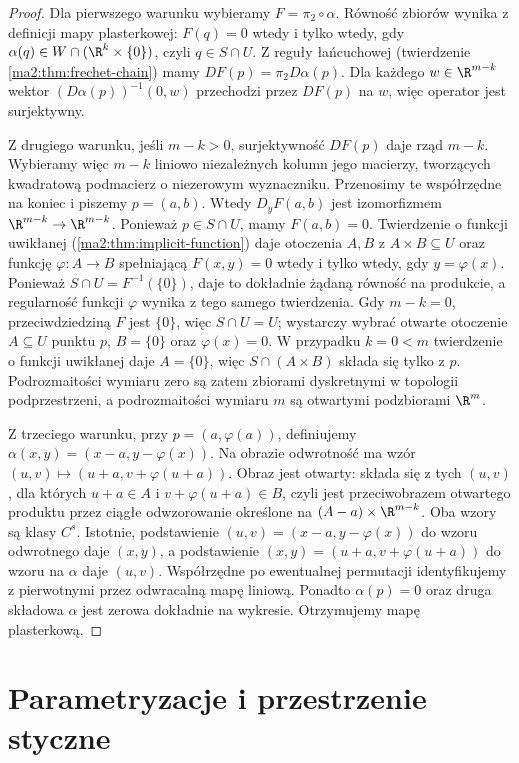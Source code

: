 \begin{proof}
Dla pierwszego warunku wybieramy $F=\pi_2\circ\alpha$.
Równość zbiorów wynika z definicji mapy plasterkowej:
$F(q)=0$ wtedy i tylko wtedy, gdy
$\alpha(q)\in W\cap(\R^k\times\{0\})$, czyli $q\in S\cap U$.
Z reguły łańcuchowej (twierdzenie \ref{ma2:thm:frechet-chain})
mamy $DF(p)=\pi_2D\alpha(p)$. Dla każdego $w\in\R^{m-k}$
wektor $(D\alpha(p))^{-1}(0,w)$ przechodzi przez $DF(p)$
na $w$, więc operator jest surjektywny.

Z drugiego warunku, jeśli $m-k>0$, surjektywność
$DF(p)$ daje rząd $m-k$. Wybieramy więc $m-k$
liniowo niezależnych kolumn jego macierzy, tworzących
kwadratową podmacierz o niezerowym wyznaczniku. Przenosimy te współrzędne na koniec
i piszemy $p=(a,b)$. Wtedy $D_yF(a,b)$ jest
izomorfizmem $\R^{m-k}\to\R^{m-k}$.
Ponieważ $p\in S\cap U$, mamy $F(a,b)=0$.
Twierdzenie o funkcji uwikłanej
(\ref{ma2:thm:implicit-function}) daje otoczenia
$A,B$ z $A\times B\subseteq U$ oraz funkcję
$\varphi:A\to B$ spełniającą
$F(x,y)=0$ wtedy i tylko wtedy, gdy $y=\varphi(x)$.
Ponieważ $S\cap U=F^{-1}(\{0\})$, daje to dokładnie
żądaną równość na produkcie, a regularność funkcji
$\varphi$ wynika z tego samego twierdzenia.
Gdy $m-k=0$, przeciwdziedziną $F$ jest $\{0\}$,
więc $S\cap U=U$; wystarczy wybrać otwarte
otoczenie $A\subseteq U$ punktu $p$, $B=\{0\}$
oraz $\varphi(x)=0$. W przypadku $k=0<m$
twierdzenie o funkcji uwikłanej daje $A=\{0\}$,
więc $S\cap(A\times B)$ składa się tylko z $p$.
Podrozmaitości wymiaru zero są zatem zbiorami
dyskretnymi w topologii podprzestrzeni, a podrozmaitości
wymiaru $m$ są otwartymi podzbiorami $\R^m$.

Z trzeciego warunku, przy $p=(a,\varphi(a))$,
definiujemy $\alpha(x,y)=(x-a,y-\varphi(x))$.
Na obrazie odwrotność ma wzór
$(u,v)\mapsto(u+a,v+\varphi(u+a))$.
Obraz jest otwarty: składa się z tych $(u,v)$,
dla których $u+a\in A$ i $v+\varphi(u+a)\in B$,
czyli jest przeciwobrazem otwartego produktu przez
ciągłe odwzorowanie określone na $(A-a)\times\R^{m-k}$.
Oba wzory są klasy $C^s$. Istotnie, podstawienie
$(u,v)=(x-a,y-\varphi(x))$ do wzoru odwrotnego daje
$(x,y)$, a podstawienie $(x,y)=(u+a,v+\varphi(u+a))$
do wzoru na $\alpha$ daje $(u,v)$.
Współrzędne po ewentualnej permutacji identyfikujemy
z pierwotnymi przez odwracalną mapę liniową.
Ponadto $\alpha(p)=0$ oraz
druga składowa $\alpha$ jest zerowa dokładnie na wykresie.
Otrzymujemy mapę plasterkową.
\end{proof}

\section{Parametryzacje i przestrzenie styczne}

